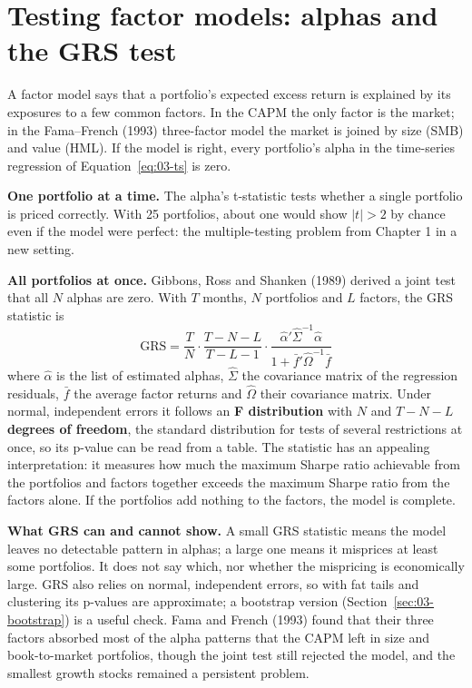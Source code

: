 \section{Testing factor models: alphas and the GRS test}
\label{sec:03-grs}

A factor model says that a portfolio's expected excess return is explained by its exposures to a few common factors. In the CAPM the only factor is the market; in the Fama--French (1993) three-factor model the market is joined by size (SMB) and value (HML). If the model is right, every portfolio's alpha in the time-series regression of Equation~\eqref{eq:03-ts} is zero.

\textbf{One portfolio at a time.} The alpha's t-statistic tests whether a single portfolio is priced correctly. With 25 portfolios, about one would show $|t| > 2$ by chance even if the model were perfect: the multiple-testing problem from Chapter 1 in a new setting.

\textbf{All portfolios at once.} Gibbons, Ross and Shanken (1989) derived a joint test that all $N$ alphas are zero. With $T$ months, $N$ portfolios and $L$ factors, the GRS statistic is
\begin{equation}
  \mathrm{GRS} = \frac{T}{N}\cdot\frac{T-N-L}{T-L-1}\cdot\frac{\hat\alpha'\hat\Sigma^{-1}\hat\alpha}{1+\bar f'\hat\Omega^{-1}\bar f}
  \label{eq:03-grs}
\end{equation}
where $\hat\alpha$ is the list of estimated alphas, $\hat\Sigma$ the covariance matrix of the regression residuals, $\bar f$ the average factor returns and $\hat\Omega$ their covariance matrix. Under normal, independent errors it follows an \textbf{F distribution} with $N$ and $T - N - L$ \textbf{degrees of freedom}, the standard distribution for tests of several restrictions at once, so its p-value can be read from a table. The statistic has an appealing interpretation: it measures how much the maximum Sharpe ratio achievable from the portfolios and factors together exceeds the maximum Sharpe ratio from the factors alone. If the portfolios add nothing to the factors, the model is complete.

\textbf{What GRS can and cannot show.} A small GRS statistic means the model leaves no detectable pattern in alphas; a large one means it misprices at least some portfolios. It does not say which, nor whether the mispricing is economically large. GRS also relies on normal, independent errors, so with fat tails and clustering its p-values are approximate; a bootstrap version (Section~\ref{sec:03-bootstrap}) is a useful check. Fama and French (1993) found that their three factors absorbed most of the alpha patterns that the CAPM left in size and book-to-market portfolios, though the joint test still rejected the model, and the smallest growth stocks remained a persistent problem.

